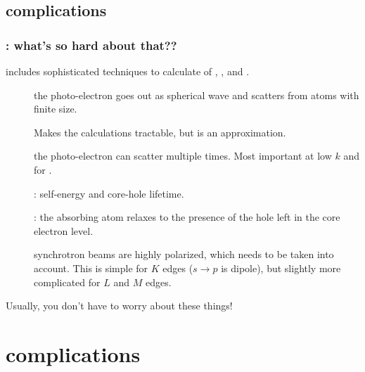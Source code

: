 \subsection{{\feff}   complications}
\begin{frame} \frametitle{{\feff}: what's so hard about that??}

  \begin{cenpage}{105mm}
    {\feff} includes sophisticated techniques to calculate of ,
    , and .

    \begin{description}
    \item[] the photo-electron goes out as
      spherical wave and scatters from atoms with finite size.

    \item[] Makes the calculations
      tractable, but is an approximation.

    \item[]  the photo-electron can scatter
      multiple times. Most important at low $k$ and for .

    \item[] {}: self-energy and
      core-hole lifetime.

    \item[] {}: the absorbing atom
      relaxes to the presence of the hole left in the core electron level.

    \item[] synchrotron beams are highly
      polarized, which needs to be taken into account.  This is simple for
      $K$ edges ($s\rightarrow p$ is dipole), but slightly more complicated for
      $L$ and $M$ edges.

    \end{description}

    \end{cenpage}
\vmm
\begin{center} Usually, you don't have to worry about these things!\end{center}

\end{frame}


\section{{\feff} complications}

